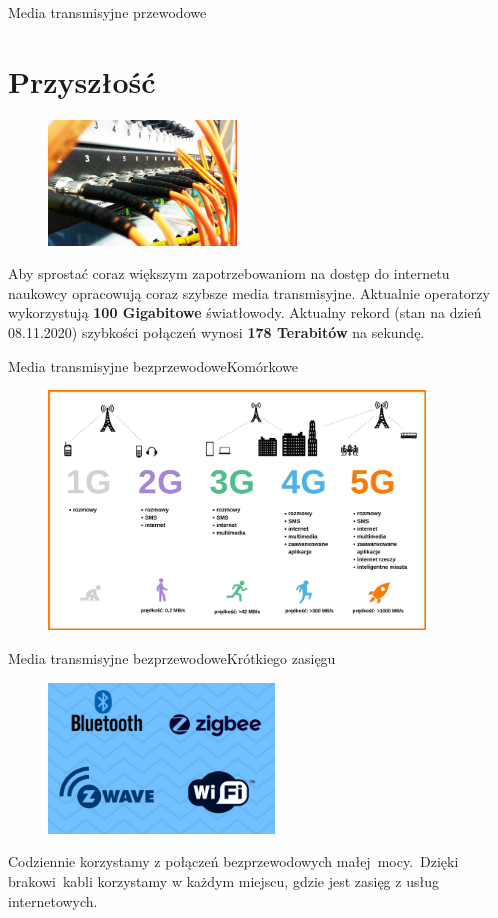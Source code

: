 \documentclass{beamer}
\begin{document}
	\begin{frame}{Media transmisyjne przewodowe}
		\section{Przyszłość}
		\begin{figure}
			\includegraphics[width=5cm]{swiatlowod.jpg}
		\end{figure}
		Aby sprostać coraz większym zapotrzebowaniom na dostęp do internetu naukowcy opracowują coraz szybsze media transmisyjne. Aktualnie operatorzy wykorzystują \textbf{100 Gigabitowe} światłowody. Aktualny rekord (stan na dzień 08.11.2020) szybkości połączeń wynosi \textbf{178 Terabitów} na sekundę. \cite{art:rekord_internetu}
	\end{frame}
	\begin{frame}{Media transmisyjne bezprzewodowe}{Komórkowe}
		~
		\begin{figure}
			\vspace{-100pt}
			\includegraphics[width=10cm]{od-1G-do-5G.jpg}
		\end{figure}
	\end{frame}
	\begin{frame}{Media transmisyjne bezprzewodowe}{Krótkiego zasięgu}
		\begin{figure}
			\vspace{-10pt}
			\includegraphics[width=6cm]{defining-zigbeee.png}
		\end{figure}
	Codziennie korzystamy z połączeń bezprzewodowych małej~mocy.~Dzięki brakowi~kabli korzystamy w każdym miejscu, gdzie jest zasięg z usług internetowych.
	\end{frame}
\end{document}
